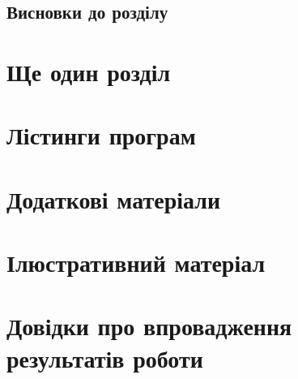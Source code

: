 \documentclass{pma-bthesis}
\begin{document}
\section{Висновки до розділу}

\chapter{Ще один розділ}

\conclusions




\appendix

\chapter{Лістинги програм}

\chapter{Додаткові матеріали}

\chapter{Ілюстративний матеріал}

\chapter{Довідки про впровадження результатів роботи}
\end{document}
